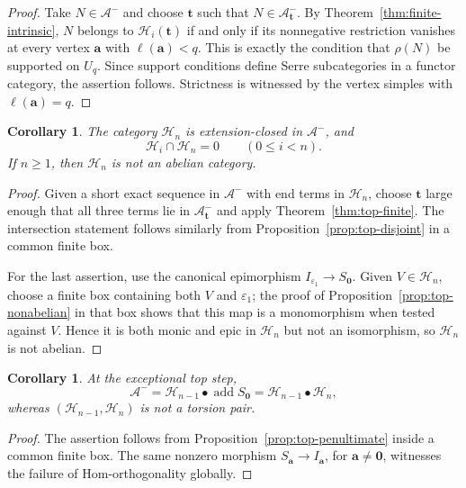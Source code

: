 \documentclass[10pt,a4paper]{amsart}
\newtheorem{corollary}[theorem]{Corollary}
\begin{document}
\begin{proof}
Take $N\in\mathcal A^-$ and choose $\mathbf t$ such that $N\in\mathcal A^-_{\mathbf t}$.  By Theorem~\ref{thm:finite-intrinsic}, $N$ belongs to $\mathcal H_i(\mathbf t)$ if and only if its nonnegative restriction vanishes at every vertex $\mathbf a$ with $\ell(\mathbf a)<q$.  This is exactly the condition that $\rho(N)$ be supported on $U_q$.  Since support conditions define Serre subcategories in a functor category, the assertion follows.  Strictness is witnessed by the vertex simples with $\ell(\mathbf a)=q$.
\end{proof}

\begin{corollary}\label{cor:global-top}
The category $\mathcal H_n$ is extension-closed in $\mathcal A^-$, and
\[
\mathcal H_i\cap\mathcal H_n=0
\qquad(0\le i<n).
\]
If $n\ge1$, then $\mathcal H_n$ is not an abelian category.
\end{corollary}

\begin{proof}
Given a short exact sequence in $\mathcal A^-$ with end terms in
$\mathcal H_n$, choose $\mathbf t$ large enough that all three terms lie in
$\mathcal A^-_{\mathbf t}$ and apply Theorem~\ref{thm:top-finite}.  The
intersection statement follows similarly from
Proposition~\ref{prop:top-disjoint} in a common finite box.

For the last assertion, use the canonical epimorphism
$I_{\varepsilon_1}\to S_{\mathbf0}$.  Given $V\in\mathcal H_n$, choose a
finite box containing both $V$ and $\varepsilon_1$; the proof of
Proposition~\ref{prop:top-nonabelian} in that box shows that this map is a
monomorphism when tested against $V$.  Hence it is both monic and epic in
$\mathcal H_n$ but not an isomorphism, so $\mathcal H_n$ is not abelian.
\end{proof}

\begin{corollary}\label{cor:global-top-extension}
At the exceptional top step,
\[
\mathcal A^-=
\mathcal H_{n-1}\bullet\operatorname{add}S_{\mathbf0}
=
\mathcal H_{n-1}\bullet\mathcal H_n,
\]
whereas $(\mathcal H_{n-1},\mathcal H_n)$ is not a torsion pair.
\end{corollary}

\begin{proof}
The assertion follows from Proposition~\ref{prop:top-penultimate} inside a
common finite box.  The same nonzero morphism
$S_{\mathbf a}\to I_{\mathbf a}$, for $\mathbf a\ne\mathbf0$, witnesses the
failure of Hom-orthogonality globally.
\end{proof}
\end{document}
